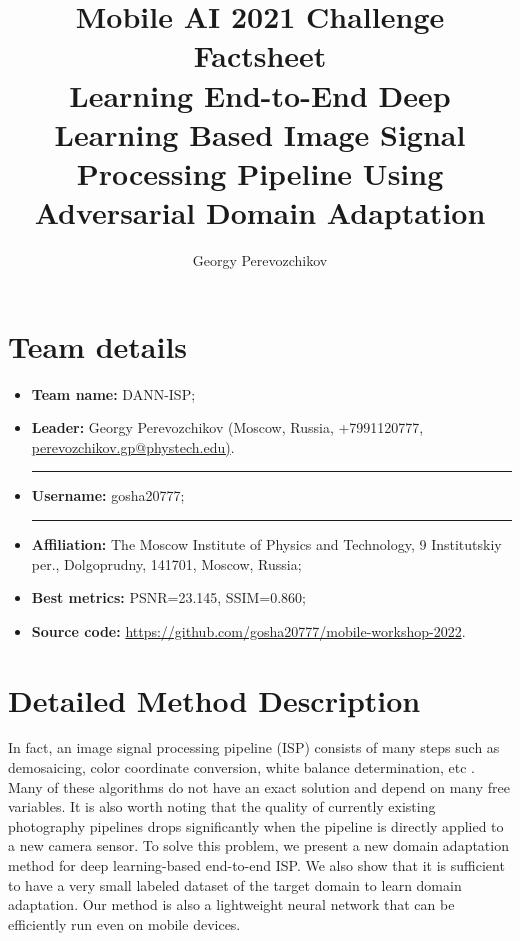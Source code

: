 \documentclass{article}
\title{Mobile AI 2021 Challenge Factsheet \\ \vspace{6mm}
{Learning End-to-End Deep Learning Based Image Signal Processing Pipeline Using Adversarial Domain Adaptation}
}
\author{Georgy Perevozchikov}
\begin{document}
\maketitle

\bigskip

\section{Team details}

\bigskip

\begin{itemize}
\item \textbf{Team name:} DANN-ISP;
\item \textbf{Leader:} Georgy Perevozchikov (Moscow, Russia, +7991120777, \href{mailto:perevozchikov.gp@phystech.edu)}{perevozchikov.gp@phystech.edu)}.

\noindent\rule{12cm}{0.4pt}

\item \textbf{Username:} gosha20777;

\noindent\rule{12cm}{0.4pt}

\item \textbf{Affiliation:} The Moscow Institute of Physics and Technology, 9 Institutskiy per., Dolgoprudny, 141701, Moscow, Russia;
\item \textbf{Best metrics:} PSNR=23.145, SSIM=0.860;
\item \textbf{Source code:} \href{https://github.com/gosha20777/mobile-workshop-2022}{https://github.com/gosha20777/mobile-workshop-2022}.

\end{itemize}

\smallskip

\section{Detailed Method Description}

\bigskip

In fact, an image signal processing pipeline (ISP) consists of many steps such as demosaicing, color coordinate conversion, white balance determination, etc \cite{karaimer2016software}. Many of these algorithms do not have an exact solution and depend on many free variables. It is also worth noting that the quality of currently existing photography pipelines drops significantly when the pipeline is directly applied to a new camera sensor. To solve this problem, we present a new domain adaptation \cite{ganin2016domain} method for deep learning-based end-to-end ISP. We also show that it is sufficient to have a very small labeled dataset of the target domain to learn domain adaptation. Our method is also a lightweight neural network that can be efficiently run even on mobile devices.
\end{document}
